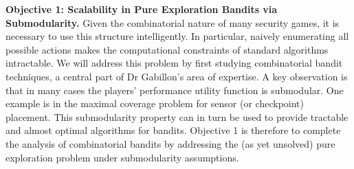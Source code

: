 \textbf{Objective 1: Scalability in Pure Exploration Bandits via Submodularity.}
Given the combinatorial nature of many security games, it is necessary to use this structure intelligently.  In particular, naively enumerating all possible actions makes the computational constraints of standard algorithms intractable.  
We will address this problem by first studying combinatorial bandit techniques, %
 a central part of Dr Gabillon's area of expertise.   A key observation is that in many cases the players' performance utility function is submodular. One example is in the maximal coverage problem for sensor (or checkpoint) placement\cite{krause2011randomized}. 
 This submodularity property can in turn be used to provide tractable and almost optimal algorithms for bandits. \cite{gabillon2013adaptive}
Objective 1 is therefore to complete the analysis of combinatorial bandits by addressing the (as yet unsolved) pure exploration problem under submodularity assumptions.
% 
 
 

